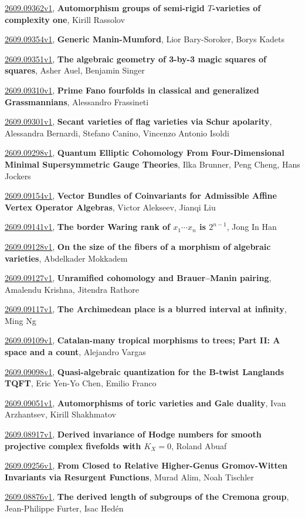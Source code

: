 \documentclass[9pt, a4paper]{article}
\theoremstyle{plain}
\theoremstyle{definition}
\theoremstyle{remark}
\newcommand{\arxiv}[3]{\href{https://arxiv.org/abs/#1}{#1}, \textbf{\textcolor{arxivblue}{#2}}, #3}
\begin{document}
\arxiv{2609.09362v1}{Automorphism groups of semi-rigid $T$-varieties of complexity one}{Kirill Rassolov}

\arxiv{2609.09354v1}{Generic Manin-Mumford}{Lior Bary-Soroker, Borys Kadets}

\arxiv{2609.09351v1}{The algebraic geometry of 3-by-3 magic squares of squares}{Asher Auel, Benjamin Singer}

\arxiv{2609.09310v1}{Prime Fano fourfolds in classical and generalized Grassmannians}{Alessandro Frassineti}

\arxiv{2609.09301v1}{Secant varieties of flag varieties via Schur apolarity}{Alessandra Bernardi, Stefano Canino, Vincenzo Antonio Isoldi}

\arxiv{2609.09298v1}{Quantum Elliptic Cohomology From Four-Dimensional Minimal Supersymmetric Gauge Theories}{Ilka Brunner, Peng Cheng, Hans Jockers}

\arxiv{2609.09154v1}{Vector Bundles of Coinvariants for Admissible Affine Vertex Operator Algebras}{Victor Alekseev, Jianqi Liu}

\arxiv{2609.09141v1}{The border Waring rank of $x_1\cdots x_n$ is $2^{n-1}$}{Jong In Han}

\arxiv{2609.09128v1}{On the size of the fibers of a morphism of algebraic varieties}{Abdelkader Mokkadem}

\arxiv{2609.09127v1}{Unramified cohomology and Brauer--Manin pairing}{Amalendu Krishna, Jitendra Rathore}

\arxiv{2609.09117v1}{The Archimedean place is a blurred interval at infinity}{Ming Ng}

\arxiv{2609.09109v1}{Catalan-many tropical morphisms to trees; Part II: A space and a count}{Alejandro Vargas}

\arxiv{2609.09098v1}{Quasi-algebraic quantization for the B-twist Langlands TQFT}{Eric Yen-Yo Chen, Emilio Franco}

\arxiv{2609.09051v1}{Automorphisms of toric varieties and Gale duality}{Ivan Arzhantsev, Kirill Shakhmatov}

\arxiv{2609.08917v1}{Derived invariance of Hodge numbers for smooth projective complex fivefolds with $K_X = 0$}{Roland Abuaf}

\arxiv{2609.09256v1}{From Closed to Relative Higher-Genus Gromov-Witten Invariants via Resurgent Functions}{Murad Alim, Noah Tischler}

\arxiv{2609.08876v1}{The derived length of subgroups of the Cremona group}{Jean-Philippe Furter, Isac Hedén}
\end{document}
